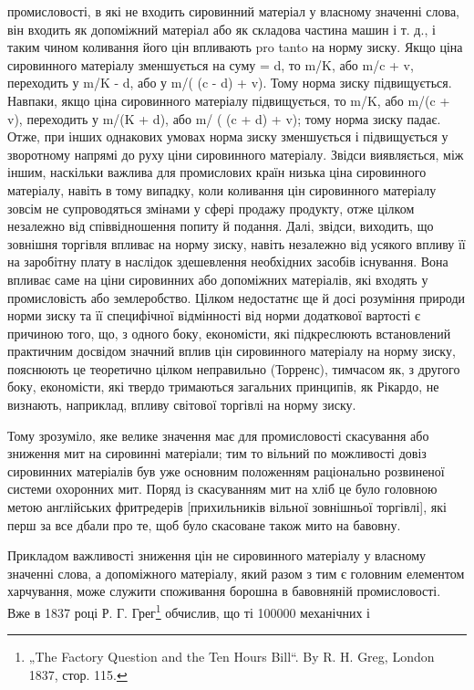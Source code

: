 промисловості, в які не входить сировинний матеріал у власному значенні слова, він входить як
допоміжний матеріал або як складова частина машин і т. д., і таким чином коливання його цін
впливають pro tanto на норму зиску. Якщо ціна сировинного матеріалу зменшується на суму = d, то m/K,
або m/c + v, переходить у m/K - d, або у
m/( (c - d) + v). Тому норма зиску підвищується. Навпаки, якщо ціна сировинного матеріалу
підвищується, то m/K, або m/(c + v), переходить у m/(K + d), або m/ ( (c + d) + v); тому норма зиску
падає. Отже, при інших однакових умовах норма
зиску зменшується і підвищується у зворотному напрямі до руху ціни сировинного матеріалу. Звідси
виявляється, між іншим, наскільки важлива для промислових країн низька ціна сировинного матеріалу,
навіть в тому випадку, коли коливання цін сировинного матеріалу зовсім не супроводяться змінами у
сфері продажу продукту, отже цілком незалежно від співвідношення попиту й подання. Далі, звідси,
виходить, що зовнішня торгівля впливає на норму зиску, навіть незалежно від усякого впливу її на
заробітну плату в наслідок здешевлення необхідних засобів існування. Вона впливає саме на ціни
сировинних або допоміжних матеріалів, які входять у промисловість або землеробство. Цілком
недостатнє ще й досі розуміння природи норми зиску та її специфічної відмінності від норми
додаткової вартості є причиною того, що, з одного боку, економісти, які підкреслюють встановлений
практичним досвідом значний вплив цін сировинного матеріалу на норму зиску, пояснюють це теоретично
цілком неправильно (Торренс), тимчасом як, з другого боку, економісти, які твердо тримаються
загальних принципів, як Рікардо, не визнають, наприклад, впливу світової торгівлі на норму зиску.

Тому зрозуміло, яке велике значення має для промисловості скасування або зниження мит на сировинні
матеріали; тим то вільний по можливості довіз сировинних матеріалів був уже основним положенням
раціонально розвиненої системи охоронних мит. Поряд із скасуванням мит на хліб це було головною
метою англійських фритредерів [прихильників вільної зовнішньої торгівлі], які перш за все дбали про
те, щоб було скасоване також мито на бавовну.

Прикладом важливості зниження цін не сировинного матеріалу у власному значенні слова, а допоміжного
матеріалу, який разом з тим є головним елементом харчування, може служити споживання борошна в
бавовняній промисловості. Вже в 1837 році Р. Г. Грег\footnote{
„The Factory Question and the Ten Hours Bill“. By R. H. Greg, London 1837, стор. 115.
} обчислив, що ті 100000 механічних і